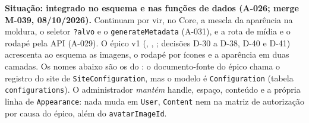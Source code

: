\textbf{Situação: integrado no esquema e nas funções de dados (A-026; merge M-039, 08/10/2026).} Continuam por vir, no Core, a mescla da aparência na moldura, o seletor \texttt{?alvo} e o \texttt{generateMetadata} (A-031), e a rota de mídia e o rodapé pela API (A-029). O épico v1 (, , ; decisões D-30 a D-38, D-40 e D-41) acrescenta ao esquema as imagens, o rodapé por ícones e a aparência em duas camadas. Os nomes abaixo são os do : o documento-fonte do épico chama o registro do site de \texttt{SiteConfiguration}, mas o modelo é \texttt{Configuration} (tabela \texttt{configurations}). O administrador \emph{mantém} handle, espaço, conteúdo e a própria linha de \texttt{Appearance}: nada muda em \texttt{User}, \texttt{Content} nem na matriz de autorização por causa do épico, além do \texttt{avatarImageId}.

